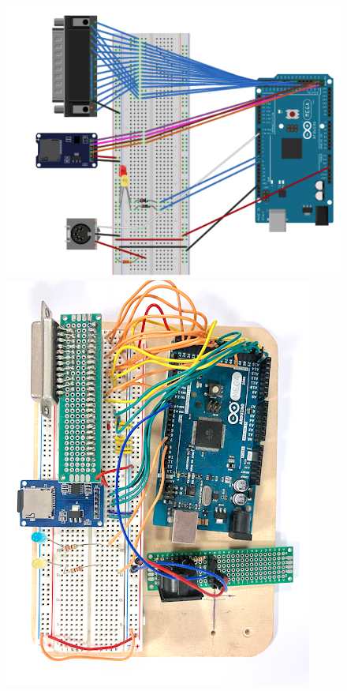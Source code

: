 \begin{figure}[h!]
    \centering
    \begin{minipage}[t]{0.61\textwidth}
        \centering
        \includegraphics[width=\linewidth]{chapters/appendix/b/image/figb-ilcaosdellesfere-arduino01.png}
    \end{minipage}%
    \hfill
    \begin{minipage}[t]{0.35\textwidth}
        \centering
        \includegraphics[width=\linewidth]{chapters/appendix/b/image/figb-ilcaosdellesfere-arduino02.png}

\end{minipage}
\end{figure}
